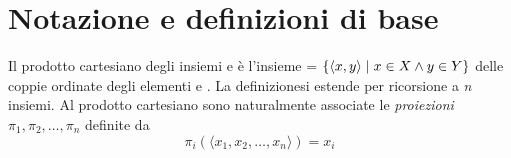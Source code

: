 \section{Notazione e definizioni di base}
Il prodotto cartesiano degli insiemi  e  è l'insieme  = $\{\langle x, y \rangle \hspace{1mm}|\hspace{1mm} x \in X \land y \in Y\}$ delle coppie ordinate degli elementi  e . La definizionesi estende per ricorsione a \textit{n} insiemi. Al prodotto cartesiano  sono naturalmente associate le \textit{proiezioni} $\pi_1, \pi_2, \dots, \pi_n$ definite da
\begin{equation}
    \pi_i(\langle x_1, x_2, \dots, x_n \rangle) = x_i
\end{equation}